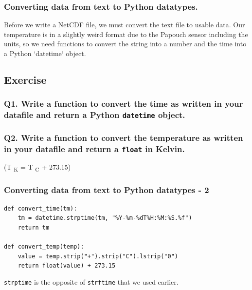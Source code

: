 \documentclass[aspectratio=1610,9pt]{beamer} %
\begin{document}
\begin{frame}
\frametitle{Converting data from text to Python
datatypes.}

Before we write a NetCDF file, we must convert the text file to usable
data. Our temperature is in a slightly weird format due to the Papouch
sensor including the units, so we need functions to convert the string
into a number and the time into a Python `datetime` object.

\subsection{Exercise}

\subsubsection{Q1. Write a function to convert the time as written in
your datafile and return a Python \texttt{datetime}
object.}

\subsubsection{Q2. Write a function to convert the temperature as
written in your datafile and return a \texttt{float} in
Kelvin.}

(T \textsubscript{K} = T \textsubscript{C} + 273.15)

\end{frame}
\begin{frame}[fragile]
\frametitle{Converting data from text to Python datatypes -
2}

\begin{verbatim}
def convert_time(tm):
    tm = datetime.strptime(tm, "%Y-%m-%dT%H:%M:%S.%f")
    return tm

def convert_temp(temp):
    value = temp.strip("+").strip("C").lstrip("0")
    return float(value) + 273.15
\end{verbatim}

\texttt{strptime} is the opposite of \texttt{strftime} that we used
earlier.

\end{frame}
\end{document}
